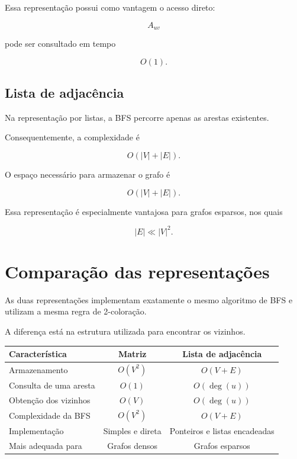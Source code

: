 \documentclass[12pt,a4paper]{article}
\begin{document}
Essa representação possui como vantagem o acesso direto:

$$
A_{uv}
$$

pode ser consultado em tempo

$$
O(1).
$$

\subsection{Lista de adjacência}

Na representação por listas, a BFS percorre apenas as arestas
existentes.

Consequentemente, a complexidade é

$$
O(|V|+|E|).
$$

O espaço necessário para armazenar o grafo é

$$
O(|V|+|E|).
$$

Essa representação é especialmente vantajosa para grafos esparsos,
nos quais

$$
|E|\ll |V|^2.
$$


\section{Comparação das representações}

As duas representações implementam exatamente o mesmo algoritmo de
BFS e utilizam a mesma regra de 2-coloração.

A diferença está na estrutura utilizada para encontrar os vizinhos.

\begin{center}
\begin{tabular}{lcc}
\hline
\textbf{Característica} &
\textbf{Matriz} &
\textbf{Lista de adjacência} \\
\hline
Armazenamento &
$O(V^2)$ &
$O(V+E)$ \\

Consulta de uma aresta &
$O(1)$ &
$O(\deg(u))$ \\

Obtenção dos vizinhos &
$O(V)$ &
$O(\deg(u))$ \\

Complexidade da BFS &
$O(V^2)$ &
$O(V+E)$ \\

Implementação &
Simples e direta &
Ponteiros e listas encadeadas \\

Mais adequada para &
Grafos densos &
Grafos esparsos \\
\hline
\end{tabular}
\end{center}
\end{document}
